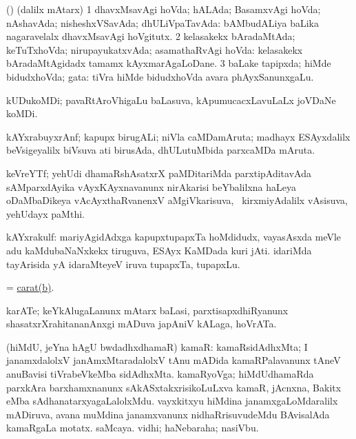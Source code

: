 \bentry
{}
\gl{\gu}
\bmng
(\ashi) (\AKAyx dalilx mAtarx) 
\bnum
\num{1} dhavxMsavAgi hoVda; hALAda; BasamxvAgi hoVda; nAshavAda; nisheshxVSavAda; dhULiVpaTavAda:  bAMbudALiya baLika nagaravelalx dhavxMsavAgi hoVgitutx. 
\num{2} kelasakekx bAradaMtAda; keTuTxhoVda; nirupayukatxvAda; asamathaRvAgi hoVda:  kelasakekx bAradaMtAgidadx tamamx kAyxmarAgaLoDane. 
\num{3} baLake tapipxda; hiMde bidudxhoVda; gata:  tiVra hiMde bidudxhoVda avara phAyxSanunxgaLu. 
\enum
\emng
\eentry

\bentry
{}
\gl{\nA}
\bmng
kUDukoMDi; pavaRtAroVhigaLu baLasuva, kApumucacxLavuLaLx joVDaNe koMDi.  
\emng
\eentry

\bentry
{}
\gl{\nA}
\bmng
kAYxrabuyxrAnf; kapupx birugALi; niVla caMDamAruta; madhayx ESAyxdalilx beVsigeyalilx biVsuva ati birusAda, dhULutuMbida parxcaMDa mAruta. 
\emng
\eentry

\bentry
{}
\gl{\nA}
\bmng
keVreYTf; yehUdi dhamaRshAsatxrX paMDitariMda parxtipAditavAda sAMparxdAyika vAyxKAyxnavanunx nirAkarisi beYbalilxna haLeya oDaMbaDikeya vAcAyxthaRvanenxV aMgiVkarisuva, \kanmu\ kirxmiyAdalilx vAsisuva, yehUdayx paMthi. 
\emng
\eentry

\bentry
{}
\gl{\nA}
\bmng
kAYxrakulf: 
\banum
{} mariyAgidAdxga kapupxtupapxTa hoMdidudx, vayasAsxda meVle adu kaMdubaNaNxkekx tiruguva, ESAyx KaMDada kuri jAti. 
 idariMda tayArisida yA idaraMteyeV iruva tupapxTa, tupapxLu. 
\eanum
\emng
\eentry

\bentry
{}
\gl{\nA}
\bmng
= \hyperref{kandict_c.pdf}{C}{carat(b)}{carat(b)}. 
\emng
\eentry

\bentry
{}
\gl{\nA}
\bmng
karATe; keYkAlugaLanunx mAtarx baLasi, parxtisapxdhiRyanunx shasatxrXrahitananAnxgi mADuva japAniV kALaga, hoVrATa. 
\emng
\eentry

\bentry
{}
\gl{\nA}
\bmng
(hiMdU, jeYna hAgU bwdadhxdhamaR) kamaR: 
\banum
{} kamaRsidAdhxMta; I janamxdalolxV janAmxMtaradalolxV tAnu mADida kamaRPalavanunx tAneV anuBavisi tiVrabeVkeMba sidAdhxMta. 
 kamaRyoVga; hiMdUdhamaRda parxkAra barxhamxnanunx sAkASxtakxrisikoLuLxva kamaR, jAcnxna, Bakitx eMba sAdhanatarxyagaLalolxMdu. 
 vayxkitxyu hiMdina janamxgaLoMdaralilx mADiruva, avana muMdina janamxvanunx nidhaRrisuvudeMdu BAvisalAda kamaRgaLa motatx. saMcaya. 
 vidhi; haNebaraha; nasiVbu. 
\eanum
\emng
\eentry

